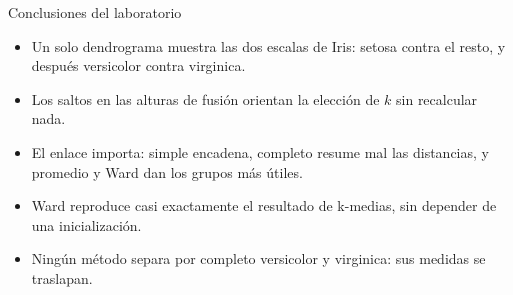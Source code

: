 \begin{frame}{Conclusiones del laboratorio}
  \begin{itemize}
    \item Un solo dendrograma muestra las dos escalas de Iris: setosa contra el resto, y después
          versicolor contra virginica.
    \item Los saltos en las alturas de fusión orientan la elección de $k$ sin recalcular nada.
    \item El enlace importa: simple encadena, completo resume mal las distancias, y promedio y Ward
          dan los grupos más útiles.
    \item Ward reproduce casi exactamente el resultado de k-medias, sin depender de una inicialización.
    \item Ningún método separa por completo versicolor y virginica: sus medidas se traslapan.
  \end{itemize}
\end{frame}
